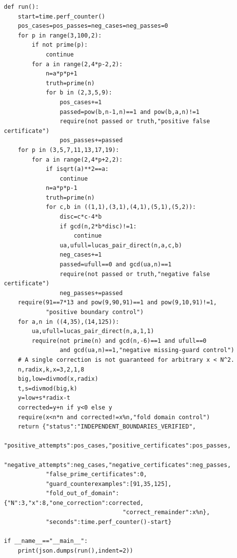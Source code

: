 \documentclass[11pt,a4paper]{article}
\theoremstyle{definition}\newtheorem{definition}[theorem]{Definition}
\theoremstyle{remark}\newtheorem{remark}[theorem]{Remark}
\begin{document}
\begin{lstlisting}[label=lst:boundary-audit]
def run():
    start=time.perf_counter()
    pos_cases=pos_passes=neg_cases=neg_passes=0
    for p in range(3,100,2):
        if not prime(p):
            continue
        for a in range(2,4*p-2,2):
            n=a*p*p+1
            truth=prime(n)
            for b in (2,3,5,9):
                pos_cases+=1
                passed=pow(b,n-1,n)==1 and pow(b,a,n)!=1
                require(not passed or truth,"positive false certificate")
                pos_passes+=passed
    for p in (3,5,7,11,13,17,19):
        for a in range(2,4*p+2,2):
            if isqrt(a)**2==a:
                continue
            n=a*p*p-1
            truth=prime(n)
            for c,b in ((1,1),(3,1),(4,1),(5,1),(5,2)):
                disc=c*c-4*b
                if gcd(n,2*b*disc)!=1:
                    continue
                ua,ufull=lucas_pair_direct(n,a,c,b)
                neg_cases+=1
                passed=ufull==0 and gcd(ua,n)==1
                require(not passed or truth,"negative false certificate")
                neg_passes+=passed
    require(91==7*13 and pow(9,90,91)==1 and pow(9,10,91)!=1,
            "positive boundary control")
    for a,n in ((4,35),(14,125)):
        ua,ufull=lucas_pair_direct(n,a,1,1)
        require(not prime(n) and gcd(n,-6)==1 and ufull==0
                and gcd(ua,n)==1,"negative missing-guard control")
    # A single correction is not guaranteed for arbitrary x < N^2.
    n,radix,k,x=3,2,1,8
    big,low=divmod(x,radix)
    t,s=divmod(big,k)
    y=low+s*radix-t
    corrected=y+n if y<0 else y
    require(x<n*n and corrected!=x%n,"fold domain control")
    return {"status":"INDEPENDENT_BOUNDARIES_VERIFIED",
            "positive_attempts":pos_cases,"positive_certificates":pos_passes,
            "negative_attempts":neg_cases,"negative_certificates":neg_passes,
            "false_prime_certificates":0,
            "guard_counterexamples":[91,35,125],
            "fold_out_of_domain":{"N":3,"x":8,"one_correction":corrected,
                                  "correct_remainder":x%n},
            "seconds":time.perf_counter()-start}

if __name__=="__main__":
    print(json.dumps(run(),indent=2))

\end{lstlisting}
\end{document}

